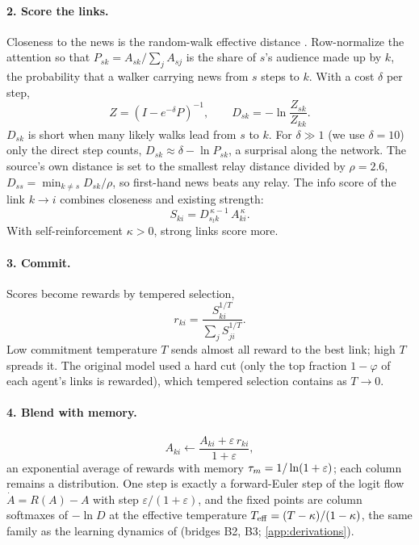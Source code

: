\paragraph{2. Score the links.} Closeness to the news is the random-walk effective distance \citep{brockmann2013hidden}.
Row-normalize the attention so that $P_{sk}=A_{sk}/\sum_j A_{sj}$ is the share of $s$'s audience made up by $k$, the
probability that a walker carrying news from $s$ steps to $k$. With a cost $\delta$ per step,
\begin{equation}
  Z=(I-e^{-\delta}P)^{-1},\qquad D_{sk}=-\ln\frac{Z_{sk}}{Z_{kk}} .
\end{equation}
$D_{sk}$ is short when many likely walks lead from $s$ to $k$. For $\delta\gg 1$ (we use $\delta=10$) only the direct
step counts, $D_{sk}\approx\delta-\ln P_{sk}$, a surprisal along the network. The source's own distance is set to the
smallest relay distance divided by $\rho=2.6$, $D_{ss}=\min_{k\ne s}D_{sk}/\rho$, so first-hand news beats any relay. The
info score of the link $k\to i$ combines closeness and existing strength:
\begin{equation}
  S_{ki}=D_{s_t k}^{\,\kappa-1}\,A_{ki}^{\,\kappa}.
\end{equation}
With self-reinforcement $\kappa>0$, strong links score more.

\paragraph{3. Commit.} Scores become rewards by tempered selection,
\begin{equation}
  r_{ki}=\frac{S_{ki}^{1/T}}{\sum_j S_{ji}^{1/T}} .
\end{equation}
Low commitment temperature $T$ sends almost all reward to the best link; high $T$ spreads it. The original model used a
hard cut (only the top fraction $1-\varphi$ of each agent's links is rewarded), which tempered selection contains as
$T\to 0$.

\paragraph{4. Blend with memory.}
\begin{equation}
  A_{ki}\leftarrow\frac{A_{ki}+\varepsilon\,r_{ki}}{1+\varepsilon},
\end{equation}
an exponential average of rewards with memory $\tau_m=1/\ln(1+\varepsilon)$; each column remains a distribution. One
step is exactly a forward-Euler step of the logit flow $\dot A=R(A)-A$ with step $\varepsilon/(1+\varepsilon)$, and the
fixed points are column softmaxes of $-\ln D$ at the effective temperature $T_{\mathrm{eff}}=(T-\kappa)/(1-\kappa)$, the same family
as the learning dynamics of \citet{sato2003coupled} (bridges B2, B3; \cref{app:derivations}).

